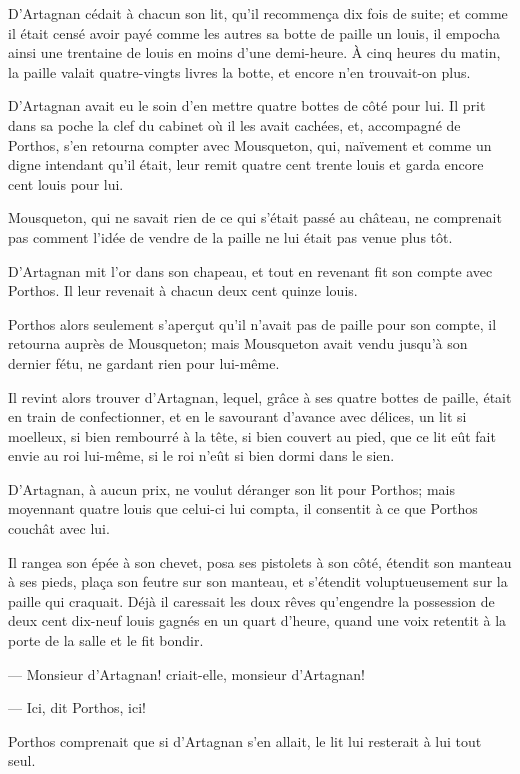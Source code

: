 D'Artagnan cédait à chacun son lit, qu'il recommença dix fois de suite; et comme il était censé avoir payé comme les autres sa botte de paille un louis, il empocha ainsi une trentaine de louis en moins d'une demi-heure. À cinq heures du matin, la paille valait quatre-vingts livres la botte, et encore n'en trouvait-on plus.

D'Artagnan avait eu le soin d'en mettre quatre bottes de côté pour lui. Il prit dans sa poche la clef du cabinet où il les avait cachées, et, accompagné de Porthos, s'en retourna compter avec Mousqueton, qui, naïvement et comme un digne intendant qu'il était, leur remit quatre cent trente louis et garda encore cent louis pour lui.

Mousqueton, qui ne savait rien de ce qui s'était passé au château, ne comprenait pas comment l'idée de vendre de la paille ne lui était pas venue plus tôt.

D'Artagnan mit l'or dans son chapeau, et tout en revenant fit son compte avec Porthos. Il leur revenait à chacun deux cent quinze louis.

Porthos alors seulement s'aperçut qu'il n'avait pas de paille pour son compte, il retourna auprès de Mousqueton; mais Mousqueton avait vendu jusqu'à son dernier fétu, ne gardant rien pour lui-même.

Il revint alors trouver d'Artagnan, lequel, grâce à ses quatre bottes de paille, était en train de confectionner, et en le savourant d'avance avec délices, un lit si moelleux, si bien rembourré à la tête, si bien couvert au pied, que ce lit eût fait envie au roi lui-même, si le roi n'eût si bien dormi dans le sien.

D'Artagnan, à aucun prix, ne voulut déranger son lit pour Porthos; mais moyennant quatre louis que celui-ci lui compta, il consentit à ce que Porthos couchât avec lui.

Il rangea son épée à son chevet, posa ses pistolets à son côté, étendit son manteau à ses pieds, plaça son feutre sur son manteau, et s'étendit voluptueusement sur la paille qui craquait. Déjà il caressait les doux rêves qu'engendre la possession de deux cent dix-neuf louis gagnés en un quart d'heure, quand une voix retentit à la porte de la salle et le fit bondir.

— Monsieur d'Artagnan! criait-elle, monsieur d'Artagnan!

— Ici, dit Porthos, ici!

Porthos comprenait que si d'Artagnan s'en allait, le lit lui resterait à lui tout seul.

